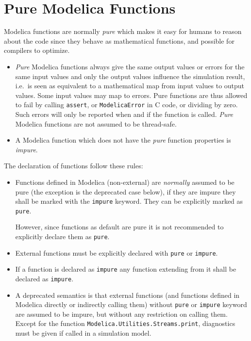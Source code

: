 \section{Pure Modelica Functions}\label{pure-modelica-functions}

Modelica functions are normally \emph{pure} which makes it easy for
humans to reason about the code since they behave as mathematical
functions, and possible for compilers to optimize.

\begin{itemize}
\item
  \emph{Pure} Modelica functions always give the same output values or
  errors for the same input values and only the output values influence
  the simulation result, i.e.\ is seen as equivalent to a mathematical
  map from input values to output values. Some input values may map to
  errors. Pure functions are thus allowed to fail by calling \lstinline!assert!, or
  \lstinline[language=C]!ModelicaError! in C code, or dividing by zero. Such errors will only be
  reported when and if the function is called.  \emph{Pure} Modelica
  functions are not assumed to be thread-safe.
\item
  A Modelica function which does not have the \emph{pure} function
  properties is \emph{impure}.
\end{itemize}

The declaration of functions follow these rules:
\begin{itemize}
\item
  Functions defined in Modelica (non-external) are \emph{normally} assumed to be pure (the exception is the deprecated case below), if they are impure they shall be marked with the \lstinline!impure! keyword.
  They can be explicitly marked as \lstinline!pure!.
  \begin{nonnormative}
  However, since functions as default are pure it is not recommended to explicitly declare them as \lstinline!pure!.
  \end{nonnormative}
\item
  External functions must be explicitly declared with \lstinline!pure! or \lstinline!impure!.
\item
  If a function is declared as \lstinline!impure! any function extending from it shall be declared as \lstinline!impure!.
\item
  A deprecated semantics is that external functions (and functions defined in Modelica directly or indirectly calling them) without \lstinline!pure! or \lstinline!impure! keyword are assumed to be
  impure, but without any restriction on calling them.  Except for the function \lstinline!Modelica.Utilities.Streams.print!, diagnostics must be given if called in a simulation model.
\end{itemize}

